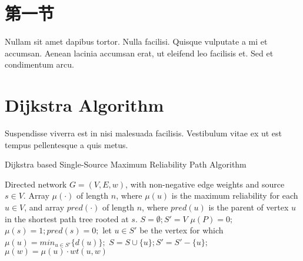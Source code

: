 \documentclass[float=true, crop=false, class=report]{standalone}
\begin{document}
    \section{第一节}
    Nullam sit amet dapibus tortor.
        Nulla facilisi. Quisque vulputate a mi et accumsan.
        Aenean lacinia accumsan erat, ut eleifend leo facilisis et.
        Sed et condimentum arcu.

    \section{Dijkstra Algorithm}
    Suspendisse viverra est in nisi malesuada facilisis.
    Vestibulum vitae ex ut est tempus pellentesque a quis metus.

    \begin{algorithm}[h]
        \caption{Dijkstra based Single-Source Maximum Reliability Path Algorithm}\label{alg:dijk8}
        \begin{algorithmic}
            \Require Directed network $G=(V,E,w)$, with non-negative edge weights and source $s \in V$.
            \Ensure Array $\mu(\cdotp)$ of length $n$, where $\mu(u)$ is the maximum reliability for each $u \in V$, and array $pred(\cdotp)$ of length $n$, where $pred(u)$ is the parent of vertex $u$ in the shortest path tree rooted at $s$.
            \medskip
            \State $S = \emptyset; S' = V$
            \State $\mu(P) = 0;$
            \EndFor
            \State $\mu(s) = 1; pred(s) = 0;$
            \State let $u \in S'$ be the vertex for which $\mu(u) = min_{u \in S'}\{d(u)\};$
            \State $S = S \cup \{ u \}; S' = S' - \{ u \};$
                    \State $\mu(w) = \mu(u) \cdotp wt(u,w)$
                    \EndIf
                \EndFor
            \EndWhile
        \end{algorithmic}
    \end{algorithm}
\end{document}
